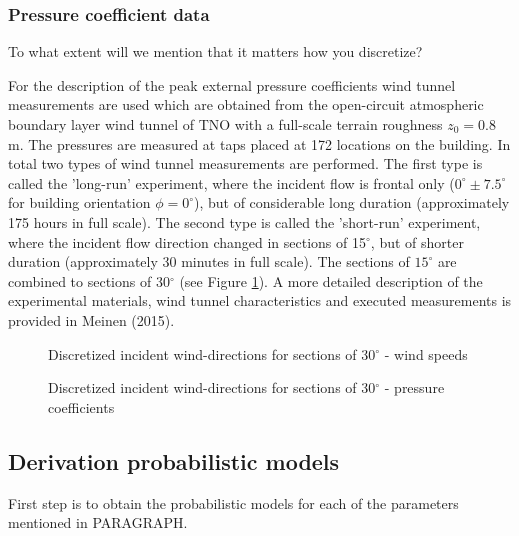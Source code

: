 \subsubsection{Pressure coefficient data}\label{subsubsec:pressure_coefficient_data}
\begin{framed}
	To what extent will we mention that it matters how you discretize?
\end{framed}
For the description of the peak external pressure coefficients wind tunnel measurements are used which are obtained from the open-circuit atmospheric boundary layer wind tunnel of TNO with a full-scale terrain roughness $z_0=0.8$ m. The pressures are measured at taps placed at 172 locations on the building. In total two types of wind tunnel measurements are performed. The first type is called the 'long-run' experiment, where the incident flow is frontal only ($0^{\circ}\pm7.5^{\circ}$ for building orientation $\phi=0^{\circ}$), but of considerable long duration (approximately 175 hours in full scale). The second type is called the 'short-run' experiment, where the incident flow direction changed in sections of 15$^{\circ}$, but of shorter duration (approximately 30 minutes in full scale). The sections of $15^{\circ}$ are combined to sections of 30$^{\circ}$ (see Figure \ref{fig:incident_wind_directions2}). A more detailed description of the experimental materials, wind tunnel characteristics and executed measurements is provided in Meinen (2015).



\begin{figure}[H]
	\begin{minipage}[]{0.5\textwidth}
		
		\caption{Discretized incident wind-directions for sections of 30$^{\circ}$ - wind speeds}
		\label{fig:incident_wind_directions}
	\end{minipage}
	\hspace{0.4cm}
	\begin{minipage}[]{0.5\textwidth}
		
		\caption{Discretized incident wind-directions for sections of 30$^{\circ}$ - pressure coefficients}
		\label{fig:incident_wind_directions2}
	\end{minipage}
\end{figure}




\subsection{Derivation probabilistic models}
First step is to obtain the probabilistic models for each of the parameters mentioned in PARAGRAPH.



